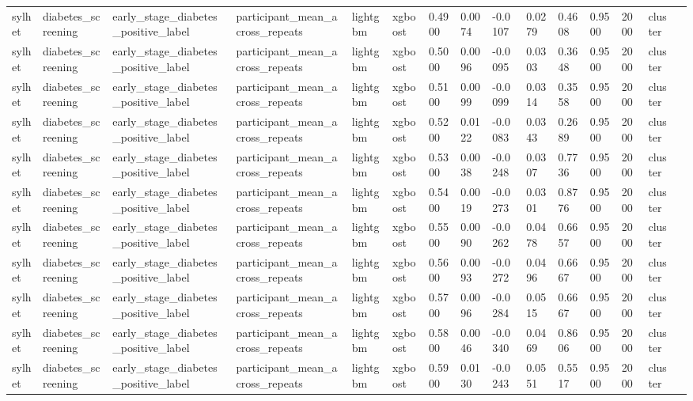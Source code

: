 \begin{tabular}{lllllllllllllll}
sylhet & diabetes\_screening & early\_stage\_diabetes\_positive\_label & participant\_mean\_across\_repeats & lightgbm & xgboost & 0.4900 & 0.0074 & -0.0107 & 0.0279 & 0.4608 & 0.9500 & 2000 & cluster &  \\
sylhet & diabetes\_screening & early\_stage\_diabetes\_positive\_label & participant\_mean\_across\_repeats & lightgbm & xgboost & 0.5000 & 0.0096 & -0.0095 & 0.0303 & 0.3648 & 0.9500 & 2000 & cluster &  \\
sylhet & diabetes\_screening & early\_stage\_diabetes\_positive\_label & participant\_mean\_across\_repeats & lightgbm & xgboost & 0.5100 & 0.0099 & -0.0099 & 0.0314 & 0.3558 & 0.9500 & 2000 & cluster &  \\
sylhet & diabetes\_screening & early\_stage\_diabetes\_positive\_label & participant\_mean\_across\_repeats & lightgbm & xgboost & 0.5200 & 0.0122 & -0.0083 & 0.0343 & 0.2689 & 0.9500 & 2000 & cluster &  \\
sylhet & diabetes\_screening & early\_stage\_diabetes\_positive\_label & participant\_mean\_across\_repeats & lightgbm & xgboost & 0.5300 & 0.0038 & -0.0248 & 0.0307 & 0.7736 & 0.9500 & 2000 & cluster &  \\
sylhet & diabetes\_screening & early\_stage\_diabetes\_positive\_label & participant\_mean\_across\_repeats & lightgbm & xgboost & 0.5400 & 0.0019 & -0.0273 & 0.0301 & 0.8776 & 0.9500 & 2000 & cluster &  \\
sylhet & diabetes\_screening & early\_stage\_diabetes\_positive\_label & participant\_mean\_across\_repeats & lightgbm & xgboost & 0.5500 & 0.0090 & -0.0262 & 0.0478 & 0.6657 & 0.9500 & 2000 & cluster &  \\
sylhet & diabetes\_screening & early\_stage\_diabetes\_positive\_label & participant\_mean\_across\_repeats & lightgbm & xgboost & 0.5600 & 0.0093 & -0.0272 & 0.0496 & 0.6667 & 0.9500 & 2000 & cluster &  \\
sylhet & diabetes\_screening & early\_stage\_diabetes\_positive\_label & participant\_mean\_across\_repeats & lightgbm & xgboost & 0.5700 & 0.0096 & -0.0284 & 0.0515 & 0.6667 & 0.9500 & 2000 & cluster &  \\
sylhet & diabetes\_screening & early\_stage\_diabetes\_positive\_label & participant\_mean\_across\_repeats & lightgbm & xgboost & 0.5800 & 0.0046 & -0.0340 & 0.0469 & 0.8606 & 0.9500 & 2000 & cluster &  \\
sylhet & diabetes\_screening & early\_stage\_diabetes\_positive\_label & participant\_mean\_across\_repeats & lightgbm & xgboost & 0.5900 & 0.0130 & -0.0243 & 0.0551 & 0.5517 & 0.9500 & 2000 & cluster &  \\

\end{tabular}
